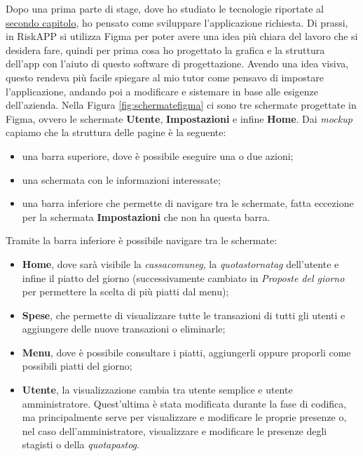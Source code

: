 Dopo una prima parte di stage, dove ho studiato le tecnologie riportate al \hyperref[sec:tecnologie]{secondo capitolo}, ho pensato come sviluppare l'applicazione richiesta.\newline
Di prassi, in RiskAPP si utilizza Figma per poter avere una idea più chiara del lavoro che si desidera fare, quindi per prima cosa ho progettato la grafica e la struttura dell'app con l'aiuto di questo software di progettazione.\newline
Avendo una idea visiva, questo rendeva più facile spiegare al mio tutor come pensavo di impostare l'applicazione, andando poi a modificare e sistemare in base alle esigenze dell'azienda.\newline
\newline
Nella Figura \ref{fig:schermatefigma} ci sono tre schermate progettate in Figma, ovvero le schermate \textbf{Utente}, \textbf{Impostazioni} e infine \textbf{Home}.\newline
Dai \emph{mockup} capiamo che la struttura delle pagine è la seguente:
\begin{itemize}
    \item una barra superiore, dove è possibile eseguire una o due azioni;
    \item una schermata con le informazioni interessate;
    \item una barra inferiore che permette di navigare tra le schermate, fatta eccezione per la schermata \textbf{Impostazioni} che non ha questa barra.
\end{itemize}
Tramite la barra inferiore è possibile navigare tra le schermate:
\begin{itemize}
    \item \textbf{Home}, dove sarà visibile la \emph{\gls{cassacomuneg}}, la \emph{\gls{quotastornatag}} dell'utente e infine il piatto del giorno (successivamente cambiato in \emph{Proposte del giorno} per permettere la scelta di più piatti dal menu);
    \item \textbf{Spese}, che permette di visualizzare tutte le transazioni di tutti gli utenti e aggiungere delle nuove transazioni o eliminarle;
    \item \textbf{Menu}, dove è possibile consultare i piatti, aggiungerli oppure proporli come possibili piatti del giorno;
    \item \textbf{Utente}, la visualizzazione cambia tra utente semplice e utente amministratore. Quest'ultima è stata modificata durante la fase di codifica, ma principalmente serve per visualizzare e modificare le proprie presenze o, nel caso dell'amministratore, visualizzare e modificare le presenze degli stagisti o della \emph{\gls{quotapastog}}.
\end{itemize}
